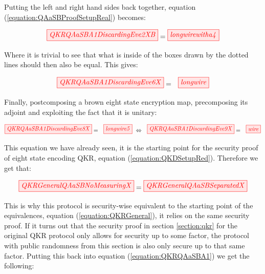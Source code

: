 \documentclass[]{article}
\begin{document}
Putting the left and right hand sides back together, equation (\ref{equation:QAaSBProofSetupReal}) becomes:

\begin{equation}
	\label{equation:backtogether}
	\tikzfig{QKRQAaSBA1DiscardingEve2XB} = \tikzfig{longwirewitha4}
\end{equation}

Where it is trivial to see that what is inside of the boxes drawn by the dotted lines should then also be equal. This gives:

\begin{equation}
\tikzfig{QKRQAaSBA1DiscardingEve6X} = ~~ \tikzfig{longwire}
\end{equation}

Finally, postcomposing a brown eight state encryption map, precomposing its adjoint and exploiting the fact that it is unitary:

\begin{equation}
\tikzfig{QKRQAaSBA1DiscardingEve8X} = ~~ \tikzfig{longwire5} ~ \Leftrightarrow ~~ \tikzfig{QKRQAaSBA1DiscardingEve9X} = ~~ \tikzfig{wire}
\end{equation}


This equation we have already seen, it is the starting point for the security proof of eight state encoding QKR, equation (\ref{equation:QKDSetupRed}). Therefore we get that:


\begin{equation}
	\label{equation:QKRGeneralSeparation}
	\tikzfig{QKRGeneralQAaSBNoMeasuringX} = \tikzfig{QKRGeneralQAaSBSeparatedX}
\end{equation}

This is why this protocol is security-wise equivalent to the starting point of the equivalences, equation (\ref{equation:QKRGeneral}), it relies on the same security proof. If it turns out that the security proof in section \ref{section:qkr} for the original QKR protocol only allows for security up to some factor, the protocol with public randomness from this section is also only secure up to that same factor. Putting this back into equation (\ref{equation:QKRQAaSBA1}) we get the following:
\end{document}
